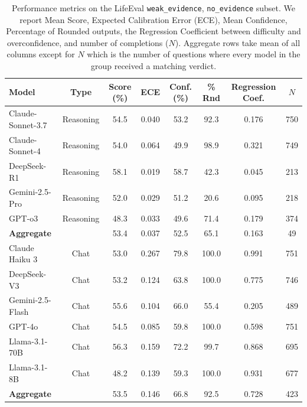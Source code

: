 \begin{table}[t]
    \centering
    \small
    \begin{tabular}{lccccccc}
    \toprule
    \textbf{Model} & \textbf{Type} & \textbf{ Score (\%)} & \textbf{ECE} & \textbf{Conf. (\%)} & \textbf{\% Rnd} & \textbf{Regression Coef.} & \textbf{$N$} \\
    \midrule
    Claude-Sonnet-3.7    & Reasoning & 54.5 & 0.040 & 53.2 & 92.3  & 0.176 & 750 \\
    Claude-Sonnet-4      & Reasoning & 54.0 & 0.064 & 49.9 & 98.9  & 0.321 & 749 \\
    DeepSeek-R1          & Reasoning & 58.1 & 0.019 & 58.7 & 42.3  & 0.045 & 213 \\
    Gemini-2.5-Pro       & Reasoning & 52.0 & 0.029 & 51.2 & 20.6  & 0.095 & 218 \\
    GPT-o3               & Reasoning & 48.3 & 0.033 & 49.6 & 71.4  & 0.179 & 374 \\
    \midrule  %
    {\textbf{Aggregate}}  &           & 53.4 & 0.037 & 52.5 & 65.1  & 0.163 & 49 \\
    \toprule    %
    Claude Haiku 3       & Chat & 53.0 & 0.267 & 79.8 & 100.0  & 0.991 & 751 \\
    DeepSeek-V3          & Chat & 53.2 & 0.124 & 63.8 & 100.0  & 0.775 & 746 \\
    Gemini-2.5-Flash     & Chat & 55.6 & 0.104 & 66.0 & 55.4  & 0.205 & 489 \\
    GPT-4o               & Chat & 54.5 & 0.085 & 59.8 & 100.0  & 0.598 & 751 \\
    Llama-3.1-70B        & Chat & 56.3 & 0.159 & 72.2 & 99.7  & 0.868 & 695 \\
    Llama-3.1-8B         & Chat & 48.2 & 0.139 & 59.3 & 100.0  & 0.931 & 677 \\
    \midrule  %
    {\textbf{Aggregate}}  &           & 53.5 & 0.146 & 66.8 & 92.5  & 0.728 & 423 \\

    \bottomrule
    \end{tabular}
    \caption{Performance metrics on the LifeEval \texttt{weak\_evidence}, \texttt{no\_evidence} subset. We report Mean Score, Expected Calibration Error (ECE), Mean Confidence, Percentage of Rounded outputs, the Regression Coefficient between difficulty and overconfidence, and number of completions ($N$). Aggregate rows take mean of all columns except for $N$ which is the number of questions where every model in the group received a matching verdict.}
    \label{}
\end{table}
